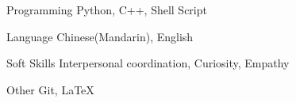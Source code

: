 

\begin{cvskills}

  \cvskill
    {Programming} %
    {Python, C++, Shell Script} %
    
  \cvskill
    {Language} %
    {Chinese(Mandarin), English} %
    
  \cvskill
    {Soft Skills} %
    {Interpersonal coordination, Curiosity, Empathy} %
    
  \cvskill
    {Other} %
    {Git, \LaTeX} %

\end{cvskills}
